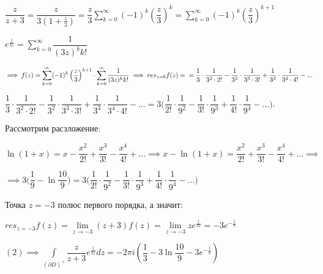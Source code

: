 \documentclass[a4paper, 12pt]{article}
\begin{document}
	\begin{center}
		$\dfrac{z}{z+3} = \dfrac{z}{3(1 + \frac{z}{3}) } = \dfrac{z}{3} \displaystyle\sum\limits_{k=0}^{\infty} (-1)^{k} \left(  \dfrac{z}{3} \right)^k = \displaystyle\sum\limits_{k=0}^{\infty} (-1)^{k} \left(  \dfrac{z}{3} \right)^{k+1} $
		
		$e^{\frac{1}{3z}} = \displaystyle\sum\limits_{k=0}^{\infty} \dfrac{1}{(3z)^{k} k!}  $
		
		$\implies f(z) = \displaystyle\sum\limits_{k=0}^{\infty}  (-1)^{k} \left(  \dfrac{z}{3} \right)^{k+1}\cdot  \displaystyle\sum\limits_{k=0}^{\infty} \dfrac{1}{(3z)^{k} k!}  \implies res_{z=0} f(z) = \newline = \dfrac{1}{3} \cdot \dfrac{1}{3^2 \cdot 2!} - \dfrac{1}{3^2}\cdot \dfrac{1}{ 3^3 \cdot 3!} + \dfrac{1}{3^3} \cdot \dfrac{1}{3^4 \cdot 4!} - ...  $
		
		$ \dfrac{1}{3} \cdot \dfrac{1}{3^2 \cdot 2!} - \dfrac{1}{3^2}\cdot \dfrac{1}{ 3^3 \cdot 3!} + \dfrac{1}{3^3} \cdot \dfrac{1}{3^4 \cdot 4!} - ...  = 3\bigg( \dfrac{1}{2!} \cdot \dfrac{1}{9^2} - \dfrac{1}{3!} \cdot \dfrac{1}{9^3} + \dfrac{1}{4!} \cdot \dfrac{1}{9^4} - ...\bigg)$.
		
		Рассмотрим расзложение:
		
		$\ln(1+x) = x - \dfrac{x^2}{2!} + \dfrac{x^3}{3!} - \dfrac{x^4}{4!} + ... \implies x - \ln(1+x) = \dfrac{x^2}{2!} + \dfrac{x^3}{3!} - \dfrac{x^4}{4!} + ...  \implies $
		
		$\implies 3 \bigg( \dfrac{1}{9} - \ln\dfrac{10}{9} \bigg) = 3\bigg( \dfrac{1}{2!} \cdot \dfrac{1}{9^2} - \dfrac{1}{3!} \cdot \dfrac{1}{9^3} + \dfrac{1}{4!} \cdot \dfrac{1}{9^4} - ...\bigg)$
	\end{center}
	
	\quad Точка $z = -3$ полюс первого порядка, а значит:
	
	\begin{center}
		$res_{z=-3} f(z) = \lim\limits_{z \rightarrow -3} (z+3) f(z) = \lim\limits_{z \rightarrow -3} z e^{\frac{1}{3z}} = -3e^{-\frac{1}{9}}$
		
		$ (2) \implies \displaystyle \int\limits_{(\partial D)^+} \dfrac{z}{z+3} e^{\frac{1}{3z}} dz = -2 \pi i \left(  \dfrac{1}{3} - 3\ln\dfrac{10}{9} - 3 e^{-\frac{1}{9}} \right)$
	\end{center}
	
\end{document}
